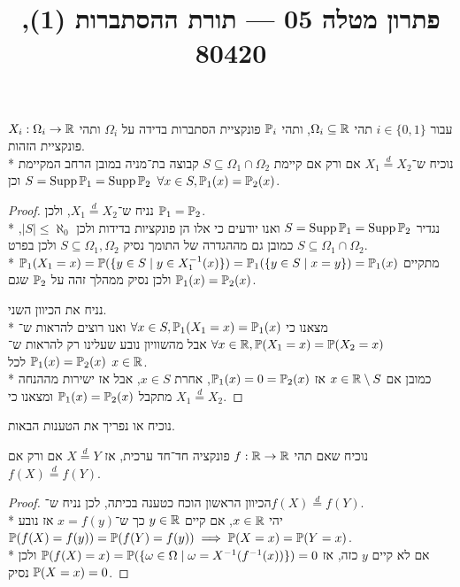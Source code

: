 
\title{פתרון מטלה 05 --- תורת ההסתברות (1), 80420}

\DeclareMathOperator{\Supp}{Supp}


\maketitle
\maketitleprint{}

\question{}
עבור $i \in \{0, 1\}$ תהי $\Omega_i \subseteq \mathbb{R}$, ותהי $\mathbb{P}_i$ פונקציית הסתברות בדידה על $\Omega_i$ ותהי $X_i : \Omega_i \to \mathbb{R}$ פונקציית הזהות. \\*
נוכיח ש־$X_1 \overset{d}{=} X_2$ אם ורק אם קיימת  $S \subseteq \Omega_1 \cap \Omega_2$ קבוצה בת־מניה במובן הרחב המקיימת $S = \Supp \PP_1 = \Supp \PP_2$ וכן $\forall x \in S, \mathbb{P}_1(x) = \mathbb{P}_2(x)$.
\begin{proof}
	נניח ש־$X_1 \overset{d}{=} X_2$, ולכן $\mathbb{P}_1 = \mathbb{P}_2$. \\*
	נגדיר $S = \Supp \PP_1 = \Supp \PP_2$ ואנו יודעים כי אלו הן פונקציות בדידות ולכן $|S| \le \aleph_0$, כמובן גם מההגדרה של התומך נסיק $S \subseteq \Omega_1, \Omega_2$ ולכן בפרט $S \subseteq \Omega_1 \cap \Omega_2$. \\*
	מתקיים $\mathbb{P}_1(X_1 = x) = \mathbb{P}(\{ y \in S \mid y \in X_1^{-1}(x) \}) = \mathbb{P}_1(\{ y \in S \mid x = y \}) = \mathbb{P}_1(x)$ ולכן נסיק ממהלך זהה על $\mathbb{P}_2$ שגם $\mathbb{P}_1(x) = \mathbb{P}_2(x)$.

	נניח את הכיוון השני. \\*
	מצאנו כי $\forall x \in S, \mathbb{P}_1(X_1 = x) = \mathbb{P}_1(x)$ ואנו רוצים להראות ש־$\forall x \in \mathbb{R}, \mathbb{P}(X_1 = x) = \mathbb{P}(X_2 = x)$ אבל מהשוויון נובע שעלינו רק להראות ש־$\mathbb{P}_1(x) = \mathbb{P}_2(x)$  לכל $x \in \mathbb{R}$. \\*
	כמובן אם $x \in \mathbb{R} \setminus S$ אז $\mathbb{P}_1(x) = 0 = \mathbb{P}_2(x)$, אחרת $x \in S$, אבל אז ישירות מההנחה מתקבל $\mathbb{P}_1(x) = \mathbb{P}_2(x)$ ומצאנו כי $X_1 \overset{d}{=} X_2$.
\end{proof}

\question{}
נוכיח או נפריך את הטענות הבאות.

\subquestion{}
נוכיח שאם תהי $f : \mathbb{R} \to \mathbb{R}$ פונקציה חד־חד ערכית, אז $X \overset{d}{=} Y$ אם ורק אם $f(X) \overset{d}{=} f(Y)$.
\begin{proof}
	הכיוון הראשון הוכח כטענה בכיתה, לכן נניח ש־$f(X) \overset{d}{=} f(Y)$. \\*
	יהי $x \in \mathbb{R}$, אם קיים $y \in \mathbb{R}$ כך ש־$x = f(y)$ אז נובע $\mathbb{P}(f(X) = f(y)) = \mathbb{P}(f(Y) = f(y)) \implies \mathbb{P}(X = x) = \mathbb{P}(Y = x)$. \\*
	אם לא קיים $y$ כזה, אז $\mathbb{P}(f(X) = x) = \mathbb{P}(\{\omega \in \Omega \mid \omega = X^{-1}(f^{-1}(x))\}) = 0$ ולכן נסיק $\mathbb{P}(X = x) = 0$.
\end{proof}

